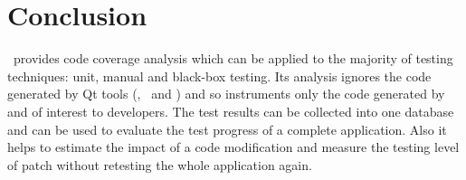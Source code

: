 \section{Conclusion}

  \TestCocoon\ provides code coverage analysis which can be applied to
the majority of testing techniques: unit, manual and
black-box testing. Its analysis ignores the code generated by Qt tools 
(\moc, \qrc\ and \uic) and so instruments only the code generated by and of interest to
developers. The test results can be collected into one database
and can be used to evaluate the test progress of a complete application.
Also it helps to estimate the impact of a code
modification and measure the testing level of patch without retesting
the whole application again.

